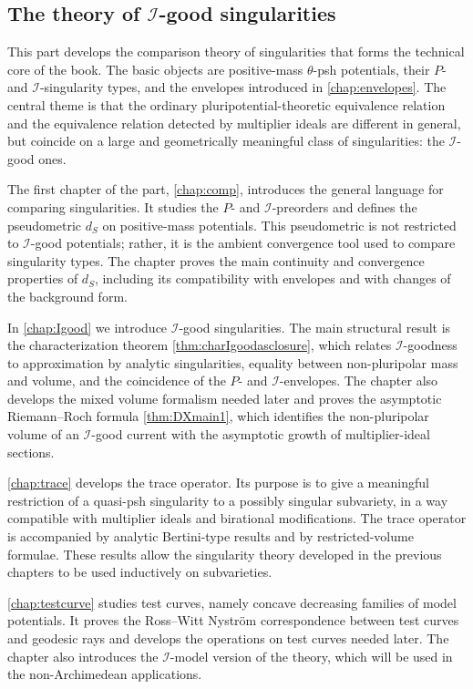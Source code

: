 \begin{partbacktext}
\part{The theory of \texorpdfstring{$\mathcal{I}$}{I}-good singularities}
\noindent
This part develops the comparison theory of singularities that forms the technical core of the book. The basic objects are positive-mass $\theta$-psh potentials, their $P$- and $\mathcal I$-singularity types, and the envelopes introduced in \cref{chap:envelopes}. The central theme is that the ordinary pluripotential-theoretic equivalence relation and the equivalence relation detected by multiplier ideals are different in general, but coincide on a large and geometrically meaningful class of singularities: the $\mathcal I$-good ones.

The first chapter of the part, \cref{chap:comp}, introduces the general language for comparing singularities. It studies the $P$- and $\mathcal I$-preorders and defines the pseudometric $d_S$ on positive-mass potentials. This pseudometric is not restricted to $\mathcal I$-good potentials; rather, it is the ambient convergence tool used to compare singularity types. The chapter proves the main continuity and convergence properties of $d_S$, including its compatibility with envelopes and with changes of the background form.

In \cref{chap:Igood} we introduce $\mathcal I$-good singularities. The main structural result is the characterization theorem \cref{thm:charIgoodasclosure}, which relates $\mathcal I$-goodness to approximation by analytic singularities, equality between non-pluripolar mass and volume, and the coincidence of the $P$- and $\mathcal I$-envelopes. The chapter also develops the mixed volume formalism needed later and proves the asymptotic Riemann--Roch formula \cref{thm:DXmain1}, which identifies the non-pluripolar volume of an $\mathcal I$-good current with the asymptotic growth of multiplier-ideal sections.

\cref{chap:trace} develops the trace operator. Its purpose is to give a meaningful restriction of a quasi-psh singularity to a possibly singular subvariety, in a way compatible with multiplier ideals and birational modifications. The trace operator is accompanied by analytic Bertini-type results and by restricted-volume formulae. These results allow the singularity theory developed in the previous chapters to be used inductively on subvarieties.

\cref{chap:testcurve} studies test curves, namely concave decreasing families of model potentials. It proves the Ross--Witt Nystr\"om correspondence between test curves and geodesic rays and develops the operations on test curves needed later. The chapter also introduces the $\mathcal I$-model version of the theory, which will be used in the non-Archimedean applications.


\end{partbacktext}

